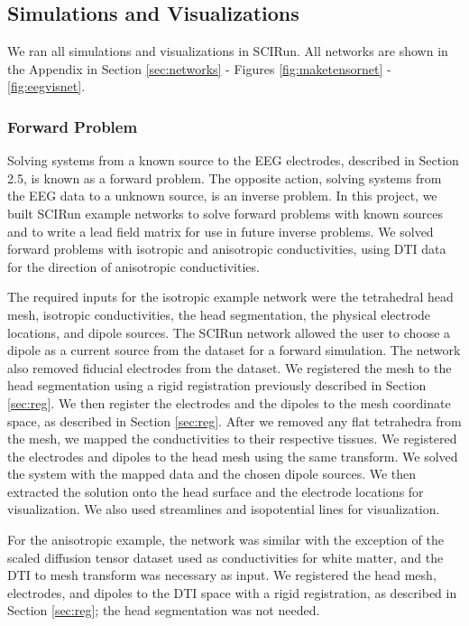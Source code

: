 \subsection{Simulations and Visualizations}
\label{sec:sim}

We ran all simulations and visualizations in SCIRun. All networks are shown in the Appendix in Section \ref{sec:networks} - Figures \ref{fig:maketensornet} - \ref{fig:eegvisnet}.

\subsubsection{Forward Problem}

Solving systems from a known source to the EEG electrodes, described in Section 2.5, is known as a forward problem. The opposite action, solving systems from the EEG data to a unknown source, is an inverse problem.  In this project, we built SCIRun example networks to solve forward problems with known sources and to write a lead field matrix for use in future inverse problems. We solved forward problems with isotropic and anisotropic conductivities, using DTI data for the direction of anisotropic conductivities.

The required inputs for the isotropic example network were the tetrahedral head mesh, isotropic conductivities, the head segmentation, the physical electrode locations, and dipole sources. The SCIRun network allowed the user to choose a dipole as a current source from the dataset for a forward simulation. The network also removed fiducial electrodes from the dataset. We registered the mesh to the head segmentation using a rigid registration previously described in Section \ref{sec:reg}. We then register the electrodes and the dipoles to the mesh coordinate space, as described in Section \ref{sec:reg}. After we removed any flat tetrahedra from the mesh, we mapped the conductivities to their respective tissues. We registered the electrodes and dipoles to the head mesh using the same transform. We solved the system with the mapped data and the chosen dipole sources. We then extracted the solution onto the head surface and the electrode locations for visualization. We also used streamlines and isopotential lines for visualization.

For the anisotropic example, the network was similar with the exception of the scaled diffusion tensor dataset used as conductivities for white matter, and the DTI to mesh transform was necessary as input. We registered the head mesh, electrodes, and dipoles to the DTI space with a rigid registration, as described in Section \ref{sec:reg}; the head segmentation was not needed.

